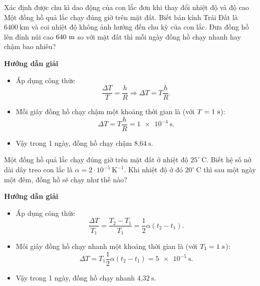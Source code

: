 \begin{dang}{Xác định được chu kì dao động của con lắc đơn khi thay đổi nhiệt độ và độ cao}
	{
		Một đồng hồ quả lắc chạy đúng giờ trên mặt đất. Biết bán kính Trái Đất là $6400\ \text{km}$ và coi nhiệt độ không ảnh hưởng đến chu kỳ của con lắc. Đưa đồng hồ lên đỉnh núi cao $640\ \text m$ so với mặt đất thì mỗi ngày đồng hồ chạy nhanh hay chậm bao nhiêu?
	}
	{
		\begin{center}
			\textbf{Hướng dẫn giải}
		\end{center}
		
		\begin{itemize}
			\item Áp dụng công thức 
			\begin{equation*}
				\dfrac{\Delta T}{T} =\dfrac{h}{R} \Rightarrow \Delta T = T \dfrac{h}{R}.
			\end{equation*}
			\item Mỗi giây đồng hồ chạy chậm một khoảng thời gian là (với $T=1\ \text s$):
			\begin{equation*}
				\Delta T = T \dfrac{h}{R}=\SI{1e-4}{\second}.
			\end{equation*}
			\item Vậy trong 1 ngày, đồng hồ chạy chậm $\text{8,64}\ \text{s}$.
		\end{itemize}
	}
	{
		Một đồng hồ quả lắc chạy đúng giờ trên mặt đất ở nhiệt độ $25^\circ\ \text{C}$. Biết hệ số nở dài dây treo con lắc là $\alpha = 2 \cdot 10^{-5}\ \text{K}^{-1}$. Khi nhiệt độ ở đó $20^\circ\ \text{C}$ thì sau một ngày một đêm, đồng hồ sẽ chạy như thế nào?
	}
	{\begin{center}
			\textbf{Hướng dẫn giải}
		\end{center}
		
		\begin{itemize}
			\item Áp dụng công thức
			\begin{equation*}
				\dfrac{\Delta T}{T_1} = \dfrac{T_2-T_1}{T_1} =\dfrac{1}{2} \alpha (t_2 -t_1).
			\end{equation*}
			\item Mối giây đồng hồ chạy nhanh một khoảng thời gian là (với $T_1=1\ \text s$):
			\begin{equation*}
				\Delta T = T_1 \dfrac{1}{2} \alpha (t_2 -t_1)=\SI{5e-5}{\second}.
			\end{equation*}
			\item Vậy trong 1 ngày, đồng hồ chạy nhanh $\text{4,32}\ \text{s}$.
		\end{itemize}
	}
\end{dang}
